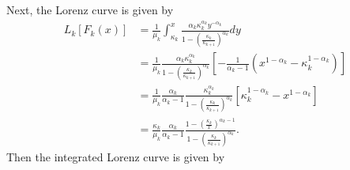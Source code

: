 \documentclass[12pt]{article}
\begin{document}
Next, the Lorenz curve is given by
\begin{align*}
  L_k[F_k(x)] & = \frac{1}{\mu_k}\int_{\kappa_k}^{x} \frac{\alpha_k\kappa_k^{\alpha_k} y^{-\alpha_k}}{1 - \left(\frac{\kappa_k}{\kappa_{k+1}}\right)^{\alpha_k}} dy  \\
              & = \frac{1}{\mu_k}\frac{\alpha_k\kappa_k^{\alpha_k}}{1 - \left(\frac{\kappa_k}{\kappa_{k+1}}\right)^{\alpha_k}}\left[-\frac{1}{\alpha_k - 1}(x^{1 - \alpha_k} - \kappa_k^{1 - \alpha_k})\right] \\
              & = \frac{1}{\mu_k}\frac{\alpha_k}{\alpha_k - 1}\frac{\kappa_k^{\alpha_k}}{1 - \left(\frac{\kappa_k}{\kappa_{k+1}}\right)^{\alpha_k}}\left[\kappa_k^{1-\alpha_k} - x^{1 - \alpha_k}\right]\\
              & = \frac{\kappa_k}{\mu_k}\frac{\alpha_k}{\alpha_k - 1}\frac{1 - \left(\frac{\kappa_k}{x}\right)^{\alpha_k - 1}}{1 - \left(\frac{\kappa_k}{\kappa_{k+1}}\right)^{\alpha_k}}.
\end{align*}
Then the integrated Lorenz curve is given by
\end{document}

